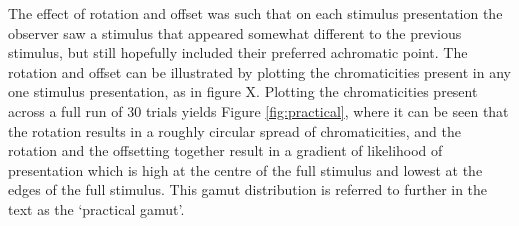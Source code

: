 The effect of rotation and offset was such that on each stimulus presentation the observer saw a stimulus that appeared somewhat different to the previous stimulus, but still hopefully included their preferred achromatic point. The rotation and offset can be illustrated by plotting the chromaticities present in any one stimulus presentation, as in figure X. %
Plotting the chromaticities present across a full run of 30 trials yields Figure \ref{fig:practical}, where it can be seen that the rotation results in a roughly circular spread of chromaticities, and the rotation and the offsetting together result in a gradient of likelihood of presentation which is high at the centre of the full stimulus and lowest at the edges of the full stimulus. This gamut distribution is referred to further in the text as the `practical gamut'.




